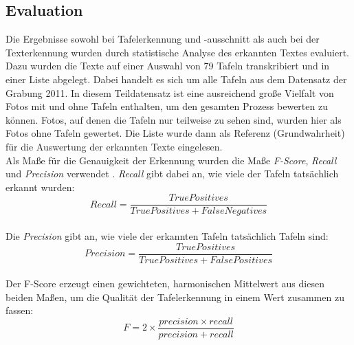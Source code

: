 
\subsection{Evaluation}

Die Ergebnisse sowohl bei Tafelerkennung und -ausschnitt als auch bei der Texterkennung wurden durch statistische Analyse des erkannten Textes evaluiert. Dazu wurden die Texte auf einer Auswahl von 79 Tafeln transkribiert und in einer Liste abgelegt. Dabei handelt es sich um alle Tafeln aus dem Datensatz der Grabung 2011. In diesem Teildatensatz ist eine ausreichend große Vielfalt von Fotos mit und ohne Tafeln enthalten, um den gesamten Prozess bewerten zu können. Fotos, auf denen die Tafeln nur teilweise zu sehen sind, wurden hier als Fotos ohne Tafeln gewertet. Die Liste wurde dann als Referenz (Grundwahrheit) für die Auswertung der erkannten Texte eingelesen.\\
Als Maße für die Genauigkeit der Erkennung wurden die Maße \textit{F-Score},  \textit{Recall} und \textit{Precision} verwendet \cite{haraldklinke}{} \cite{qixiangye}. \textit{Recall} gibt dabei an, wie viele der Tafeln tatsächlich erkannt wurden:\\ \begin{equation}Recall = \frac{True Positives}{True Positives + False Negatives}\end{equation}\\Die \textit{Precision} gibt an, wie viele der erkannten Tafeln tatsächlich Tafeln sind:\\\begin{equation}Precision = \frac{True Positives}{True Positives + False Positives}\end{equation}\\Der F-Score erzeugt einen gewichteten, harmonischen Mittelwert aus diesen beiden Maßen, um die Qualität der Tafelerkennung in einem Wert zusammen zu fassen:\\\begin{equation}F = 2 \times \frac{precision \times recall}{precision + recall}\end{equation}\\%
